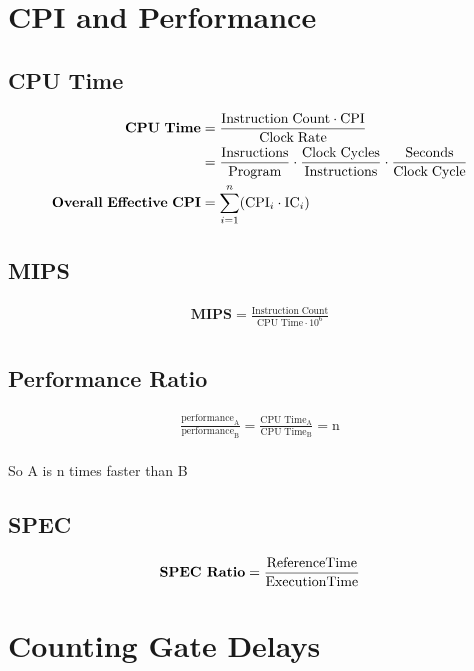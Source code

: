 \documentclass[12pt]{article}
\begin{document}
\section{CPI and Performance}
\subsection*{CPU Time}
\begin{align*}
		\mathrm{\textbf{CPU\;Time}} &= \frac{\mathrm{Instruction\;Count}\cdot{\mathrm{CPI}}}{\mathrm{Clock\;Rate}}\\
						   &= \frac{\mathrm{Insructions}}{\mathrm{Program}}\cdot{
						   \frac{\mathrm{Clock\;Cycles}}{\mathrm{Instructions}}}\cdot{\frac{\mathrm{Seconds}}{\mathrm{Clock\;Cycle}}}\\
		\mathrm{\textbf{Overall\;Effective\;CPI}} &= \sum_{i=1}^{n} (\mathrm{CPI}_{i}\cdot{\mathrm{IC}_{i}})\\
\end{align*}
	
\subsection*{MIPS}
\begin{align*}
		\mathrm{\textbf{MIPS}} = \frac{\mathrm{Instruction\;Count}}{\mathrm{CPU\;Time}\cdot{10^6}} \\
\end{align*}

\subsection*{Performance Ratio}
\begin{align*}
	\frac{\mathrm{performance}_\mathrm{A}}{\mathrm{performance}_\mathrm{B}} = \frac{\mathrm{CPU\;
	Time}_{\mathrm{A}}}{\mathrm{CPU\;Time}_{\mathrm{B}}} = \mathrm{n}\\
\end{align*}
\begin{center}
So A is n times faster than B
\end{center}

\subsection*{SPEC}
	\[
		\mathrm{\textbf{SPEC Ratio}} = \frac{\mathrm{Reference Time}}{\mathrm{Execution Time}}\\
	\]

\section{Counting Gate Delays}
\end{document}

